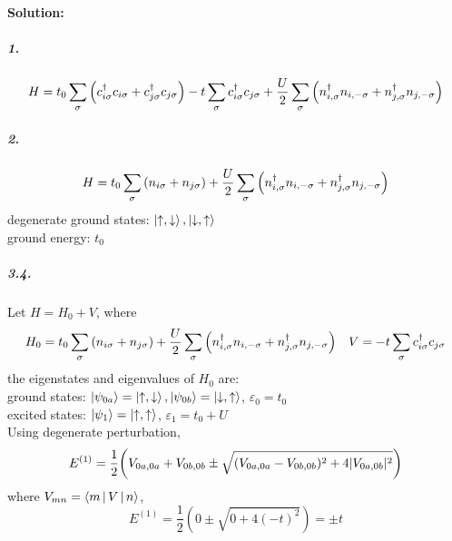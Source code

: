 \documentclass[a4paper]{article}
\DeclareMathOperator{\e}{\mathrm{e}}
\DeclareMathOperator{\I}{\mathrm{i}}
\numberwithin{equation}{section}
\begin{document}
\paragraph{Solution:}
\subparagraph{1.}
\begin{equation}\label{key}
H = t_0 \sum_\sigma\qty(c_{i\sigma}^\dagger c_{i\sigma}  + c_{j\sigma}^\dagger c_{j\sigma} ) -t\sum_\sigma c_{i\sigma}^\dagger c_{j\sigma} + \dfrac{U}{2}\sum_\sigma\qty( n_{i,\sigma}^\dagger n_{i,-\sigma} +  n_{j,\sigma}^\dagger n_{j,-\sigma}  )
\end{equation}
\subparagraph{2.}
\begin{equation}\label{key}
	H = t_0 \sum_\sigma\qty(n_{i\sigma}  + n_{j\sigma} ) + \dfrac{U}{2}\sum_\sigma\qty( n_{i,\sigma}^\dagger n_{i,-\sigma} +  n_{j,\sigma}^\dagger n_{j,-\sigma}  )
\end{equation}
degenerate ground states: $ \ket{\uparrow,\downarrow}, \ket{\downarrow,\uparrow} $\\
ground energy: $ t_0 $
\subparagraph{3.4.}
Let 
$ H = H_0 + V $,
where
\begin{equation}\label{key}
	H_0 =  t_0 \sum_\sigma\qty(n_{i\sigma}  + n_{j\sigma} ) + \dfrac{U}{2}\sum_\sigma\qty( n_{i,\sigma}^\dagger n_{i,-\sigma} +  n_{j,\sigma}^\dagger n_{j,-\sigma}  ) 
	\quad V= -t\sum_\sigma c_{i\sigma}^\dagger c_{j\sigma}
\end{equation}
the eigenstates and eigenvalues of $ H_0 $ are:\\
ground states: $ \ket{\psi_{0a}} = \ket{\uparrow,\downarrow}, \ket{\psi_{0b}} = \ket{\downarrow,\uparrow} $, $ \varepsilon_0 = t_0 $\\
excited states: $ \ket{\psi_1} = \ket{\uparrow,\uparrow} $,
 $\varepsilon_1 = t_0 + U $\\
Using degenerate perturbation,
\begin{equation}\label{key}
	E^{(1)} = \dfrac{1}{2}\qty(V_{0a,0a} + V_{0b,0b} \pm \sqrt{(V_{0a,0a} - V_{0b,0b})^2 + 4|V_{0a,0b}|^2})
\end{equation}
where $ V_{mn} = \Braket{m| V | n} $,\\
\begin{equation}\label{key}
	E^{(1)} = \dfrac{1}{2}(0 \pm \sqrt{0 + 4(-t)^2}) = \pm t
\end{equation}
\end{document}
